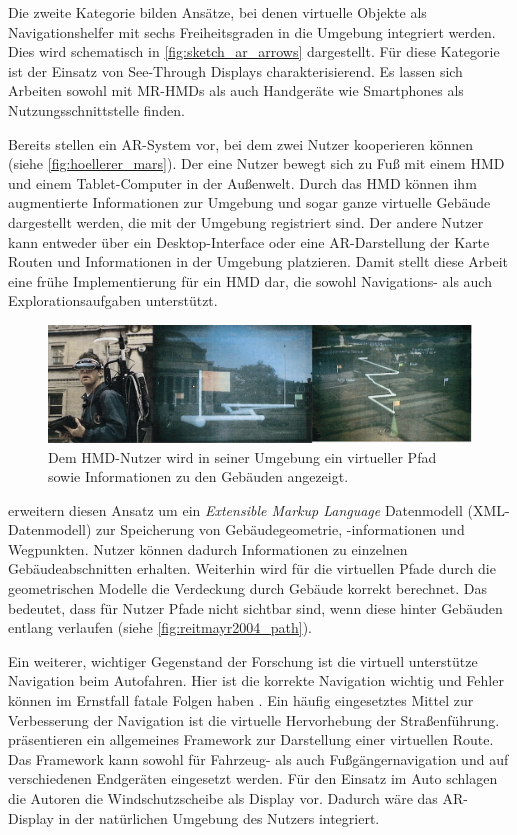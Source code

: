 Die zweite Kategorie bilden Ansätze, bei denen virtuelle Objekte als Navigationshelfer mit sechs Freiheitsgraden in die Umgebung integriert werden.
Dies wird schematisch in \autoref{fig:sketch_ar_arrows} dargestellt.
Für diese Kategorie ist der Einsatz von See-Through Displays charakterisierend.
Es lassen sich Arbeiten sowohl mit MR-HMDs als auch Handgeräte wie Smartphones als Nutzungsschnittstelle finden.

Bereits \textcite{Hoellerer1999} stellen ein AR-System vor, bei dem zwei Nutzer kooperieren können (siehe \autoref{fig:hoellerer_mars}).
Der eine Nutzer bewegt sich zu Fuß mit einem HMD und einem Tablet-Computer in der Außenwelt.
Durch das HMD können ihm augmentierte Informationen zur Umgebung und sogar ganze virtuelle Gebäude dargestellt werden, die mit der Umgebung registriert sind.
Der andere Nutzer kann entweder über ein Desktop-Interface oder eine AR-Darstellung der Karte Routen und Informationen in der Umgebung platzieren.
Damit stellt diese Arbeit eine frühe Implementierung für ein HMD dar, die sowohl Navigations- als auch Explorationsaufgaben unterstützt.
\begin{figure}
    \centering
    \includegraphics[width=\textwidth]{figures/hoellerer_ar_mars}
    \caption{Dem HMD-Nutzer wird in seiner Umgebung ein virtueller Pfad sowie Informationen zu den Gebäuden angezeigt. }
    \label{fig:hoellerer_mars}
\end{figure}

\textcite{Reitmayr2004} erweitern diesen Ansatz um ein \emph{Extensible Markup Language} Datenmodell (XML-Datenmodell) zur Speicherung von Gebäudegeometrie, -informationen und Wegpunkten.
Nutzer können dadurch Informationen zu einzelnen Gebäudeabschnitten erhalten.
Weiterhin wird für die virtuellen Pfade durch die geometrischen Modelle die Verdeckung durch Gebäude korrekt berechnet.
Das bedeutet, dass für Nutzer Pfade nicht sichtbar sind, wenn diese hinter Gebäuden entlang verlaufen (siehe \autoref{fig:reitmayr2004_path}).

Ein weiterer, wichtiger Gegenstand der Forschung ist die virtuell unterstütze Navigation beim Autofahren.
Hier ist die korrekte Navigation wichtig und Fehler können im Ernstfall fatale Folgen haben \parencite{Lin2017}.
Ein häufig eingesetztes Mittel zur Verbesserung der Navigation ist die virtuelle Hervorhebung der Straßenführung.
\textcite{Narzt2006} präsentieren ein allgemeines Framework zur Darstellung einer virtuellen Route.
Das Framework kann sowohl für Fahrzeug- als auch Fußgängernavigation und auf verschiedenen Endgeräten eingesetzt werden.
Für den Einsatz im Auto schlagen die Autoren die Windschutzscheibe als Display vor.
Dadurch wäre das AR-Display in der natürlichen Umgebung des Nutzers integriert.

